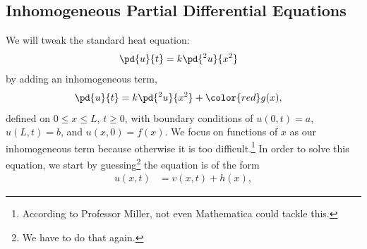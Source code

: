 \documentclass[10pt]{mypackage}
\begin{document}
\subsection{Inhomogeneous Partial Differential Equations}%
We will tweak the standard heat equation:
\begin{align*}
  \pd{u}{t} &= k\pd{^2u}{x^2}
\end{align*}
by adding an inhomogeneous term,
\begin{align*}
  \pd{u}{t} &= k\pd{^2u}{x^2} + {\color{red} g(x)},
\end{align*}
defined on $0 \leq x \leq L$, $t\geq 0$, with boundary conditions of $u\left( 0,t \right) = a$, $u\left( L,t \right) = b$, and $u\left( x,0 \right) = f(x)$. We focus on functions of $x$ as our inhomogeneous term because otherwise it is too difficult.\footnote{According to Professor Miller, not even Mathematica could tackle this.} In order to solve this equation, we start by guessing\footnote{We have to do that again.} the equation is of the form
\begin{align*}
  u\left( x,t \right) &= v\left( x,t \right) + h\left( x \right),
\end{align*}
\end{document}
